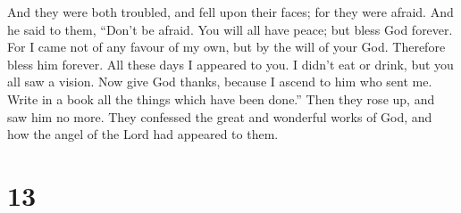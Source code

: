  And they were both troubled, and fell upon their faces;
for they were afraid.  And he said to them, ``Don't be
afraid. You will all have peace; but bless God forever. 
For I came not of any favour of my own, but by the will of your God.
Therefore bless him forever.  All these days I appeared to
you. I didn't eat or drink, but you all saw a vision.  Now
give God thanks, because I ascend to him who sent me. Write in a book
all the things which have been done.''  Then they rose up,
and saw him no more.  They confessed the great and
wonderful works of God, and how the angel of the Lord had appeared to
them.

\hypertarget{section-12}{%
\section{13}\label{section-12}}

